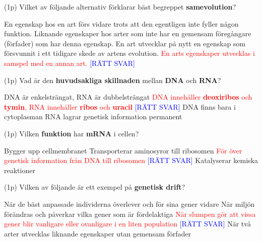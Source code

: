 \documentclass{exam}
\begin{document}
\begin{questions}
\question (1p) Vilket av följande alternativ förklarar bäst begreppet \textbf{samevolution}?
\begin{checkboxes}
\choice En egenskap hos en art förs vidare trots att den egentligen inte fyller någon funktion.
\choice Liknande egenskaper hos arter som inte har en gemensam föregångare (förfader) som har denna egenskap.
\choice En art utvecklar på nytt en egenskap som försvunnit i ett tidigare skede av artens evolution.
\correctchoice \textcolor{red}{En arts egenskaper utvecklas i samspel med en annan art.} \textcolor{blue}{[RÄTT SVAR]}
\end{checkboxes}
\vspace{5mm}
\break
\question (1p) Vad är den \textbf{huvudsakliga skillnaden} mellan \textbf{DNA} och \textbf{RNA}?
\begin{checkboxes}
    \choice DNA är enkelsträngat, RNA är dubbelsträngat
    \correctchoice \textcolor{red}{DNA innehåller \textbf{deoxiribos} och \textbf{tymin}, RNA innehåller \textbf{ribos} och \textbf{uracil}} \textcolor{blue}{[RÄTT SVAR]}
    \choice DNA finns bara i cytoplasman
    \choice RNA lagrar genetisk information permanent
\end{checkboxes}
\vspace{5mm}

\question (1p) Vilken \textbf{funktion} har \textbf{mRNA} i cellen?
\begin{checkboxes}
   \choice Bygger upp cellmembranet
   \choice Transporterar aminosyror till ribosomen
   \correctchoice \textcolor{red}{För över genetisk information från DNA till ribosomen} \textcolor{blue}{[RÄTT SVAR]}
   \choice Katalyserar kemiska reaktioner
\end{checkboxes}
\vspace{5mm}

\question (1p) Vilken av följande är ett exempel på \textbf{genetisk drift}?
\begin{checkboxes}
   \choice När de bäst anpassade individerna överlever och för sina gener vidare
   \choice När miljön förändras och påverkar vilka gener som är fördelaktiga
   \correctchoice \textcolor{red}{När slumpen gör att vissa gener blir vanligare eller ovanligare i en liten population} \textcolor{blue}{[RÄTT SVAR]}
   \choice När två arter utvecklas liknande egenskaper utan gemensam förfader
\end{checkboxes}
\vspace{5mm}

\end{questions}
\end{document}
